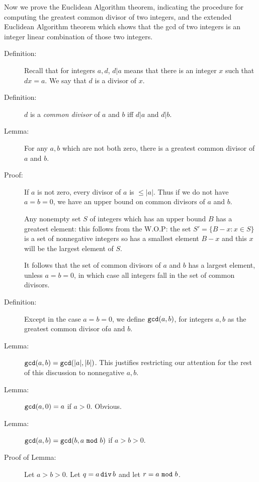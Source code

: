 \documentclass[12pt]{article}
\begin{document}
Now we prove the Euclidean Algorithm theorem, indicating the procedure for computing the greatest common divisor of two integers, and the extended Euclidean Algorithm theorem which shows that the gcd of two integers is an integer linear combination of those two integers.

\begin{description}

\item[Definition:]  Recall that for integers $a,d$, $d|a$ means that there is an integer $x$ such that $dx=a$.  We say that $d$ is a divisor of $x$.

\item[Definition:]  $d$ is a {\em common divisor\/} of $a$ and $b$ iff $d|a$ and $d|b$.

\item[Lemma:]  For any $a,b$ which are not both zero, there is a greatest common divisor of $a$ and $b$.

\item[Proof:]  If $a$ is not zero, every divisor of $a$ is $\leq |a|$.  Thus if we do not have $a=b=0$, we have an upper bound on common divisors of $a$ and $b$.

Any nonempty set $S$ of integers which has an upper bound $B$ has a greatest element:  this follows from the W.O.P:  the set $S'=\{B-x:x \in S\}$ is a set of nonnegative integers so has a smallest element $B-x$ and this $x$ will be the largest element of $S$.

It follows that the set of common divisors of $a$ and $b$ has a largest element, unless $a=b=0$, in which case all integers fall in the set of common divisors.

\item[Definition:]  Except in the case $a=b=0$, we define ${\tt gcd}(a,b)$, for integers $a,b$ as the greatest common divisor of$a$ and $b$.

\item[Lemma:]   ${\tt gcd}(a,b) = {\tt gcd}(|a|,|b|)$.  This justifies restricting our attention for the rest of this discussion to nonnegative $a,b$.

\item[Lemma:]  ${\tt gcd}(a,0)=a$ if $a>0$.  Obvious.

\item[Lemma:] ${\tt gcd}(a,b) = {\tt gcd}(b,a\,\,{\tt mod}\,\,b)$ if $a>b>0$.

\item[Proof of Lemma:]  Let $a>b>0$.  Let $q=a\,{\tt div}\,b$ and let $r=a\,\,{\tt mod}\,\,b$.


\end{description}
\end{document}
